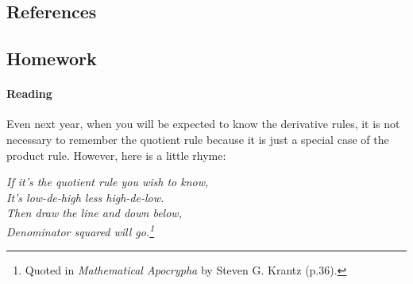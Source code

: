 \subsection{References}

\subsection{Homework}
\paragraph{Reading}
Even next year, when you will be expected to know the derivative rules, it is not necessary to remember the quotient rule because
it is just a special case of the product rule. However, here is a little rhyme:

\begin{center}\itshape
  If it's the quotient rule you wish to know,\\
  It's low-de-high less high-de-low.\\
  Then draw the line and down below,\\
  Denominator squared will go.\footnote{Quoted in \textit{Mathematical Apocrypha} by Steven G. Krantz (p.36).}
\end{center}

